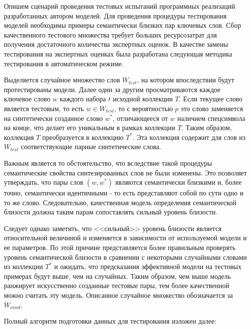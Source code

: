Опишем сценарий проведения тестовых испытаний программных реализаций разработанных автором моделей.  Для проведения процедуры тестирования моделей необходимы примеры семантически близких пар ключевых слов. Сбор качественного тестового множества требует больших ресурсозатрат для получения достаточного количества экспертных оценок. В качестве замены тестирования на экспертных оценках была разработана следующая методика тестирования в автоматическом режиме.

Выделяется случайное множество слов $W_{test}$, на котором впоследствии будут протестированы модели. Далее один за другим просматриваются каждое ключевое слово $w$ каждого набора $t$ исходной коллекции $T$. Если текущее слово является тестовым, то есть $w \in W_{test}$, то с вероятностью $p$ это слово заменяется на синтетически созданное слово $w^*$, отличающееся от $w$ наличием спецсимвола на конце, что делает его уникальным в рамках коллекции $T$. Таким образом, коллекция $T$ преобразуется в коллекцию $T^*$. Эта коллекция содержит для слов из $W_{test}$ соответствующие парные синтетические слова. 

Важным является то обстоятельство, что вследствие такой процедуры семантические свойства синтезированных слов не были изменены. Это позволяет утверждать, что пары слов $(w, w^*)$ являются семантически близкими и, более точно, семантически идентичными - то есть представляют собой по сути одно и то же слово. Следовательно, качественная модель определения семантической близости должна таким парам сопоставлять сильный уровень близости.

Следует однако заметить, что <<сильный>> уровень близости является относительной величиной и изменяется в зависимости от используемой модели и ее параметров. По этой причине представляется более правильным проверять уровень семантической близости в сравнении с некоторыми случайными словами из коллекции $T^*$ и ожидать, что предсказания эффективной модели на тестовых примерах будут выше, чем на случайных. Таким образом, чем выше модель ранжирует искусственно созданные тестовые пары, тем более качественной можно считать эту модель. Описанное случайное множество обозначается за $W_{cand}$.

Полный алгоритм подготовки данных для тестирования изложен далее:

